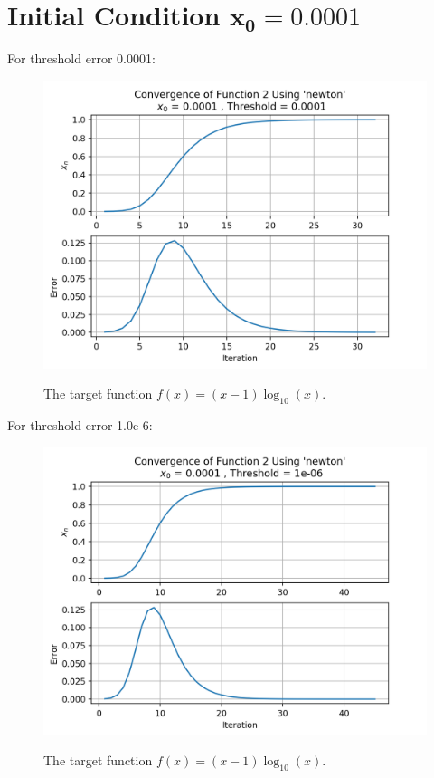 \documentclass[12pt]{article}
\begin{document}
\newpage
\section*{{\large Initial Condition $\boldsymbol{x_0 = 0.0001}$}}
	For threshold  error 0.0001:
	\begin{figure}[h]
		\caption{The target function $f(x) = (x-1)\log_{10}(x)$.}
		\centering
		\includegraphics[width=1.0\textwidth]{./figures/initial_condition_2/result_2_0001.png}
		\label{fig:plot2dot3}
	\end{figure}
	
	\newpage
	For threshold  error 1.0e-6:
		\begin{figure}[h]
		\caption{The target function $f(x) = (x-1)\log_{10}(x)$.}
		\centering
		\includegraphics[width=1.0\textwidth]{./figures/initial_condition_2/result_2_1e-06.png}
		\label{fig:plot2dot3}
	\end{figure}
	
\end{document}
